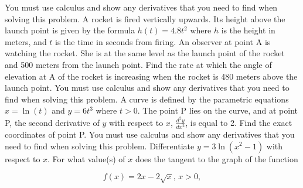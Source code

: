 \documentclass[12pt,addpoints]{exam}
\begin{document}
\begin{questions}
You must use calculus and show any derivatives that you need to find when solving this problem.
\fillwithlines{5cm}
\question[5] A rocket is fired vertically upwards. Its height above the launch point is given by the formula \( h(t) = 4.8t^2 \) where \( h \) is the height in meters, and \( t \) is the time in seconds from firing. An observer at point A is watching the rocket. She is at the same level as the launch point of the rocket and 500 meters from the launch point. Find the rate at which the angle of elevation at A of the rocket is increasing when the rocket is 480 meters above the launch point. You must use calculus and show any derivatives that you need to find when solving this problem.
\fillwithlines{5cm}
\question[5] A curve is defined by the parametric equations \( x = \ln(t) \) and \( y = 6t^3 \) where \( t > 0 \). The point P lies on the curve, and at point P, the second derivative of \( y \) with respect to \( x \), \( \frac{d^2 y}{dx^2} \), is equal to 2. Find the exact coordinates of point P. You must use calculus and show any derivatives that you need to find when solving this problem.
\fillwithlines{5cm}
\question[5] Differentiate \( y = 3\ln(x^2 - 1) \) with respect to \( x \).
\fillwithlines{5cm}
\question[5] For what value(s) of \( x \) does the tangent to the graph of the function

\[ f(x) = 2x - 2\sqrt{x}, \, x > 0, \]


\end{questions}
\end{document}
